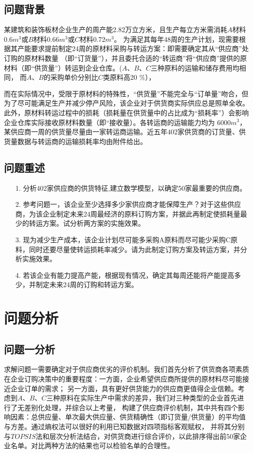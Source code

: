 \documentclass{cumcmthesis}
\begin{document}
\subsection{问题背景}
某建筑和装饰板材企业生产的周产能2.82万立方米，且生产每立方米需消耗$A$材料0.6$m^{3}$或$B$材料0.66$m^{3}$或$C$材料0.72$m^{3}$。
为满足其每年48周的生产计划，现需要根据其产能要求提前制定24周的原材料采购与转运方案：即需要确定其从“供应商”处订购的原材料数量
（即“订货量”），并且委托合适的“转运商”将“供应商”提供的原材料（即“供货量”）转运到企业仓库。($A$、$B$、$C$三种原料的运输和储存费用均相同，
而$A$、$B$的采购单价分别比$C$类原料高20 $\%$），\par
而在实际情况中，受限于原材料的特殊性，“供货量”不能完全与“订单量”吻合，但为了尽可能满足生产并减少停产风险，该企业对于供货商实际供应总是照单全收。
此外，原材料转运过程中的损耗（损耗量在供货量中的占比成为“损耗率”）会影响企业仓库实际接收原材料数量（即“接收量）。各转运商的运输能力均为
6000$m^{3}$，某供应商一周的供货量尽量由一家转运商运输。近五年402家供货商的订货量、供货量数据与转运商的运输损耗率均由附件给出。\par
\subsection{问题重述}
\begin{enumerate}
    \item [1.] 分析402家供应商的供货特征,建立数学模型，以确定50家最重要的供应商。
    \item [2.] 参考问题一，该企业至少选择多少家供应商才能保障生产？对于这些供应商，为该企业制定未来24周最经济的原料订购方案，并据此再制定使损耗量最少的转运方案。试分析两方案的实施效果。
    \item [3.] 现为减少生产成本，该企业计划尽可能多采购A原料而尽可能少采购C原料，同时还要尽量使转运损耗率减少。请为此制定订购方案及转运方案，并分析实施效果。
    \item [4.] 若该企业有能力提高产能，根据现有情况，确定其每周还能将产能提高多少，并制定未来24周的订购和转运方案。
\end{enumerate}


\section{问题分析}
\subsection{问题一分析}
求解问题一需要确定对于供应商优劣的评价机制。我们首先分析了供货商各项素质在企业订购决策中的重要程度：一方面，企业希望供应商所提供的原材料尽可能接近企业订单的需求；
另一方面，具有更好供货能力的供应商更值得企业信赖。考虑到$A$、$B$、$C$三种原料在实际生产中需求的差异，我们对三种类型的企业首先进行了无差别化处理，并综合以上考量，
构建了供应商评价机制，其中共有四个影响因素：总供应量、单次最大供应量、供货精确性（即订货量/供货量）的平均值与方差。通过熵权法可以很好的利用已知数据对四项指标客观赋权，
并将其分别与$TOPSIS$法和层次分析法结合，对供货商进行综合评价，以此排序得出前50家企业名单。对比两种方法的结果也可以检验名单的合理性。
\end{document}
